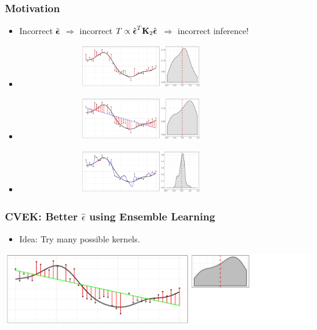 \documentclass{beamer}
\begin{document}
\begin{frame}
\frametitle{Motivation}
\begin{itemize}
\item Incorrect $\hat{\boldsymbol{\epsilon}}$ $\Rightarrow$ incorrect $T \propto \hat{\boldsymbol{\epsilon}}^T{\bf K}_2\hat{\boldsymbol{\epsilon}}$
$\Rightarrow$ incorrect inference!
\end{itemize}

\begin{itemize}
    \item[] \includegraphics[height=1.8cm, width=10.5cm]{./plot/raw_final} 
    \item[] \includegraphics[height=1.8cm, width=10.5cm]{./plot/under_final} 
    \item[] \includegraphics[height=1.8cm, width=10.5cm]{./plot/over_final} 
  \end{itemize}
\end{frame}

\begin{frame}
\frametitle{CVEK: Better $\hat{\epsilon}$ using Ensemble Learning}
\begin{itemize}
\item Idea: Try many possible kernels.
\end{itemize}
\vspace{1em}

\includegraphics[width=\linewidth]{./plot/k1} 
\end{frame}
\end{document}
